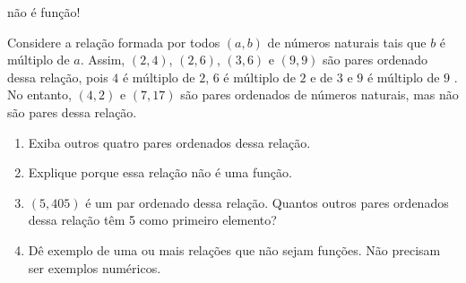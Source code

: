 \begin{task}{ não é função!}
\label{\detokenize{AF106-2:atividade-nao-e-funcao}}\label{\detokenize{AF106-2:ativ-funcoes-nao-e-funcao}}

Considere a relação formada por todos \((a,b)\) de números naturais tais que \(b\) é múltiplo de \(a\). Assim, \((2,4)\), \((2,6)\), \((3,6)\) e \((9, 9)\) são pares ordenado dessa relação, pois \(4\) é múltiplo de \(2\), \(6\) é múltiplo de \(2\) e de \(3\) e \(9\) é múltiplo de \(9\) . No entanto, \((4,2)\) e \((7,17)\) são pares ordenados de números naturais, mas não são pares dessa relação.
\begin{enumerate}
\item {} 
Exiba outros quatro pares ordenados dessa relação.

\item {} 
Explique porque essa relação não é uma função.

\item {} 
\((5, 405)\) é um par ordenado dessa relação. Quantos outros pares ordenados dessa relação têm 5 como primeiro elemento?

\item {} 
Dê exemplo de uma ou mais relações que não sejam funções. Não precisam ser exemplos numéricos.

\end{enumerate}
\end{task}

